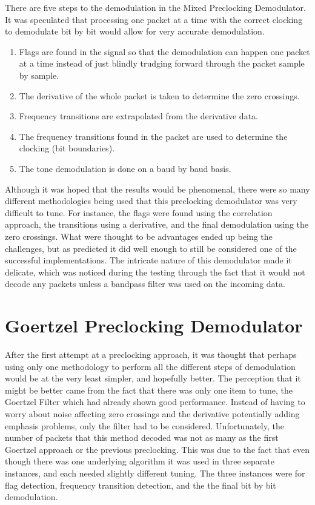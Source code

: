 There are five steps to the demodulation in the Mixed Preclocking Demodulator. It was speculated that processing one packet at a time with the correct clocking to demodulate bit by bit would allow for very accurate demodulation.
\begin{enumerate}
\item Flags are found in the signal so that the demodulation can happen one packet at a time instead of just blindly trudging forward through the packet sample by sample.
\item The derivative of the whole packet is taken to  determine the zero crossings.
\item Frequency transitions are extrapolated from the derivative data.
\item The frequency transitions found in the packet are used to determine the clocking (bit boundaries).
\item The tone demodulation is done on a baud by baud basis.
\end{enumerate}

Although it was hoped that the results would be phenomenal, there were so many different methodologies being used that this preclocking demodulator was very difficult to tune. For instance, the flags were found using the correlation approach, the transitions using a derivative, and the final demodulation using the zero crossings. What were thought to be advantages ended up being the challenges, but as predicted it did well enough to still be considered one of the successful implementations. The intricate nature of this demodulator made it delicate, which was noticed during the testing through the fact that it would not decode any packets unless a bandpass filter was used on the incoming data.

\section{Goertzel Preclocking Demodulator}
After the first attempt at a preclocking approach, it was thought that perhaps using only one methodology to perform all the different steps of demodulation would be at the very least simpler, and hopefully better. The perception that it might be better came from the fact that there was only one item to tune, the Goertzel Filter which had already shown good performance. Instead of having to worry about noise affecting zero crossings and the derivative potentially adding emphasis problems, only the filter had to be considered. Unfortunately, the number of packets that this method decoded was not as many as the first Goertzel approach or the previous preclocking. This was due to the fact that even though there was one underlying algorithm it was used in three separate instances, and each needed slightly different tuning. The three instances were for flag detection, frequency transition detection, and the the final bit by bit demodulation.


